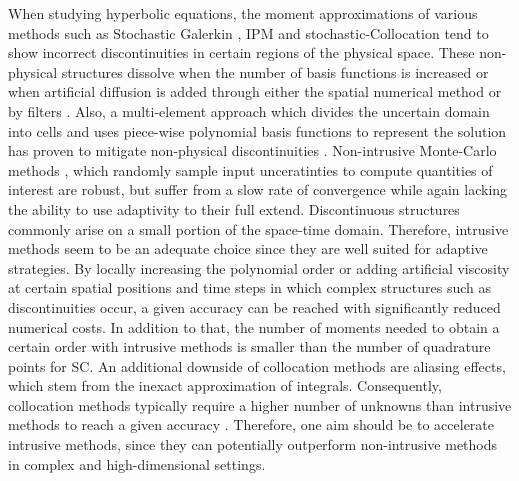 When studying hyperbolic equations, the moment approximations of various methods such as Stochastic Galerkin \cite{le2004uncertainty}, IPM \cite{kusch2018filtered,poette2019contribution} and stochastic-Collocation \cite{barth2013non,dwight2013adaptive} tend to show incorrect discontinuities in certain regions of the physical space. These non-physical structures dissolve when the number of basis functions is increased \cite{pettersson2009numerical,offner2017stability} or when artificial diffusion is added through either the spatial numerical method \cite{offner2017stability} or by filters \cite{kusch2018filtered}. Also, a multi-element approach which divides the uncertain domain into cells and uses piece-wise polynomial basis functions to represent the solution has proven to mitigate non-physical discontinuities \cite{wan2006multi,durrwachter2018hyperbolicity}. Non-intrusive Monte-Carlo methods \cite{mishra2012multi,mishra2012sparse,mishra2016numerical}, which randomly sample input unceratinties to compute quantities of interest are robust, but suffer from a slow rate of convergence while again lacking the ability to use adaptivity to their full extend. Discontinuous structures commonly arise on a small portion of the space-time domain. Therefore, intrusive methods seem to be an adequate choice since they are well suited for adaptive strategies. By locally increasing the polynomial order \cite{tryoen2012adaptive,kroker2012finite,giesselmann2017posteriori} or adding artificial viscosity \cite{kusch2018filtered} at certain spatial positions and time steps in which complex structures such as discontinuities occur, a given accuracy can be reached with significantly reduced numerical costs. In addition to that, the number of moments needed to obtain a certain order with intrusive methods is smaller than the number of quadrature points for SC. An additional downside of collocation methods are aliasing effects, which stem from the inexact approximation of integrals. Consequently, collocation methods typically require a higher number of unknowns than intrusive methods to reach a given accuracy \cite{xiu2009fast,alekseev2011estimation}. Therefore, one aim should be to accelerate intrusive methods, since they can potentially outperform non-intrusive methods in complex and high-dimensional settings. \\

